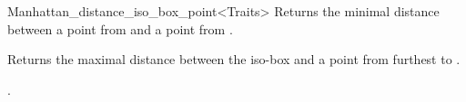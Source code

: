\begin{ccRefClass}{Manhattan_distance_iso_box_point<Traits>}
{Returns the minimal distance between a point from  and a point from
.}

{Returns the maximal distance between the iso-box  and
a point from  furthest to .}


\ccSeeAlso

.




\end{ccRefClass}


